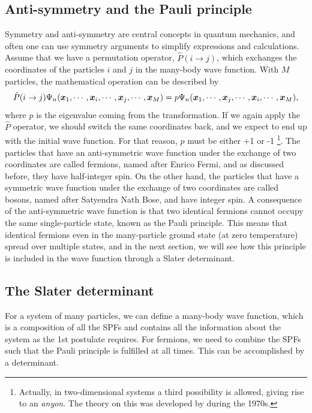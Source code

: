 \subsection{Anti-symmetry and the Pauli principle} \label{sec:symmetry}
Symmetry and anti-symmetry are central concepts in quantum mechanics, and often one can use symmetry arguments to simplify expressions and calculations. Assume that we have a permutation operator, $\hat{P}(i\rightarrow j)$, which exchanges the coordinates of the particles $i$ and $j$ in the many-body wave function. With $M$ particles, the mathematical operation can be described by
\begin{equation}
\hat{P}(i\rightarrow j)\Psi_n(\boldsymbol{{x}}_1,\cdots,\boldsymbol{{x}}_i,\cdots,\boldsymbol{{x}}_j,\cdots,\boldsymbol{{x}}_M)=p\Psi_n(\boldsymbol{{x}}_1,\cdots,\boldsymbol{{x}}_j,\cdots,\boldsymbol{{x}}_i,\cdots,\boldsymbol{{x}}_M),
\end{equation}
where $p$ is the eigenvalue coming from the transformation. If we again apply the $\hat{P}$ operator, we should switch the same coordinates back, and we expect to end up with the initial wave function. For that reason, $p$ must be either +1 or -1 \footnote{Actually, in two-dimensional systems a third possibility is allowed, giving rise to an \textit{anyon}. The theory on this was developed by \citet{leinaas_one_1977} during the 1970s.}. The particles that have an anti-symmetric wave function under the exchange of two coordinates are called fermions, named after Enrico Fermi, and as discussed before, they have half-integer spin. On the other hand, the particles that have a symmetric wave function under the exchange of two coordinates are called bosons, named after Satyendra Nath Bose, and have integer spin. A consequence of the anti-symmetric wave function is that two identical fermions cannot occupy the same single-particle state, known as the Pauli principle. This means that identical fermions even in the many-particle ground state (at zero temperature) spread over multiple states, and in the next section, we will see how this principle is included in the wave function through a Slater determinant. 

\subsection{The Slater determinant} \label{sec:slater}
For a system of many particles, we can define a many-body wave function, which is a composition of all the SPFs and contains all the information about the system as the 1st postulate requires. For fermions, we need to combine the SPFs such that the Pauli principle is fulfilled at all times. This can be accomplished by a determinant.

